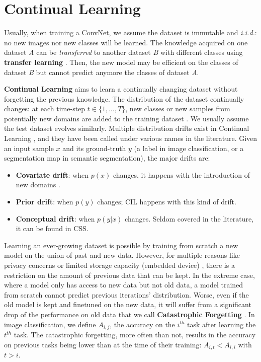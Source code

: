 \section{Continual Learning}
\label{sec:related_continual}

Usually, when training a \ac{ConvNet}, we assume the dataset is immutable and \textit{i.i.d.}: no new
images nor new classes will be learned. The knowledge acquired on one dataset \textit{A} can be
\textit{transferred} to another dataset \textit{B} with different classes using \textbf{transfer learning}
\citep{razavian2014transferlearning}. Then, the new model may be efficient on
the classes of dataset \textit{B} but cannot predict anymore the classes of dataset \textit{A}.

\textbf{Continual Learning} aims to learn a continually changing dataset without forgetting the
previous knowledge. The distribution of the dataset continually changes: \eg at each time-step $t
      \in \{1, ..., T \}$, new
classes or new samples from potentially new domains are added to the training dataset
\citep{lomonaco2017core50}. We usually assume the test dataset evolves similarly. Multiple
distribution drifts exist in Continual Learning
\citep{morenotorresa2012datasetshift,lesort2021driftanalysis}, and they have been called under
various names in the literature. Given an input sample $x$ and its ground-truth $y$ (a label in
image classification, or a segmentation map in semantic segmentation), the major drifts are:

\begin{itemize}
      \item \textbf{Covariate drift}: when $p(x)$ changes, it happens with the introduction of new
            domains \citep{volpi2021continualdomainadapt}.
      \item \textbf{Prior drift}: when $p(y)$ changes; \ac{CIL} happens with this kind of drift.
      \item \textbf{Conceptual drift}: when $p(y | x)$ changes. Seldom covered in the literature, it
            can be found in \acf{CSS}.
\end{itemize}

Learning an ever-growing dataset is possible by training from scratch a new model on the union of
past and new data. However, for multiple reasons like privacy concerns or limited storage capacity
(embedded device) \citep{vasquez2017incrementalneuralforest}, there is a restriction on the amount
of previous data that can be kept. In the extreme case, where a model only has access to new data
but not old data, a model trained from scratch cannot predict previous iterations' distribution.
Worse, even if the old model is kept and finetuned on the new data, it will suffer from a
significant drop of the performance on old data that we call \textbf{Catastrophic Forgetting}
\citep{robins1995catastrophicforgetting}. In image classification, we define $A_{i,j}$, the accuracy
on the $i^{th}$ task after learning the $t^{th}$ task. The catastrophic forgetting,
more often than not, results in the accuracy on previous tasks being lower than at the time of their
training: $A_{i,t} < A_{i,i}$ with $t > i$.


